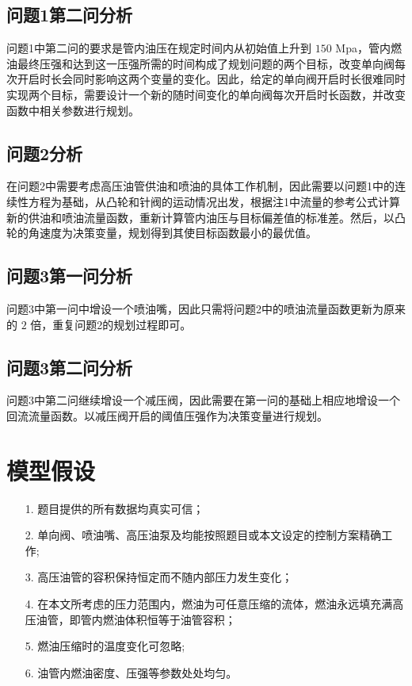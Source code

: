 \documentclass[12pt,a4paper]{article}
\begin{document}
\subsection{问题1第二问分析}
问题1中第二问的要求是管内油压在规定时间内从初始值上升到 $150$ Mpa，管内燃油最终压强和达到这一压强所需的时间构成了规划问题的两个目标，改变单向阀每次开启时长会同时影响这两个变量的变化。因此，给定的单向阀开启时长很难同时实现两个目标，需要设计一个新的随时间变化的单向阀每次开启时长函数，并改变函数中相关参数进行规划。

\subsection{问题2分析}
在问题2中需要考虑高压油管供油和喷油的具体工作机制，因此需要以问题1中的连续性方程为基础，从凸轮和针阀的运动情况出发，根据注1中流量的参考公式计算新的供油和喷油流量函数，重新计算管内油压与目标偏差值的标准差。然后，以凸轮的角速度为决策变量，规划得到其使目标函数最小的最优值。

\subsection{问题3第一问分析}
问题3中第一问中增设一个喷油嘴，因此只需将问题2中的喷油流量函数更新为原来的 $2$ 倍，重复问题2的规划过程即可。

\subsection{问题3第二问分析}
问题3中第二问继续增设一个减压阀，因此需要在第一问的基础上相应地增设一个回流流量函数。以减压阀开启的阈值压强作为决策变量进行规划。

\section{模型假设}
\begin{itemize}
\item[1.] 题目提供的所有数据均真实可信；
\item[2.] 单向阀、喷油嘴、高压油泵及均能按照题目或本文设定的控制方案精确工作;
\item[3.] 高压油管的容积保持恒定而不随内部压力发生变化；
\item[4.] 在本文所考虑的压力范围内，燃油为可任意压缩的流体，燃油永远填充满高压油管，即管内燃油体积恒等于油管容积；
\item[5.] 燃油压缩时的温度变化可忽略;
\item[6.] 油管内燃油密度、压强等参数处处均匀。
\end{itemize}
\end{document}
